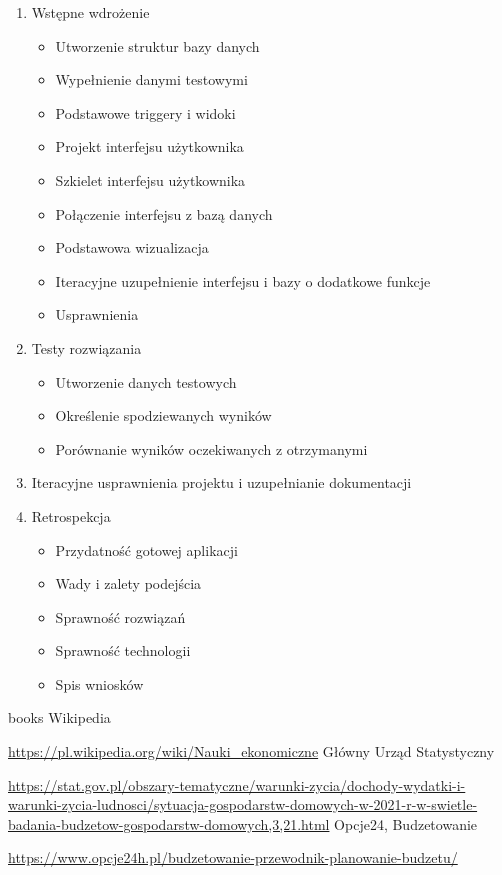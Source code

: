 \documentclass[a4paper,12pt]{report}
\begin{document}
{\begin{enumerate}
\begin{itemize}
    \end{itemize}
    \item Wstępne wdrożenie
    \begin{itemize}
        \item Utworzenie struktur bazy danych
        \item Wypełnienie danymi testowymi
        \item Podstawowe triggery i widoki
        \item Projekt interfejsu użytkownika
        \item Szkielet interfejsu użytkownika
        \item Połączenie interfejsu z bazą danych
        \item Podstawowa wizualizacja
        \item Iteracyjne uzupełnienie interfejsu i bazy o dodatkowe funkcje
        \item Usprawnienia
    \end{itemize}
    \item Testy rozwiązania
    \begin{itemize}
        \item Utworzenie danych testowych
        \item Określenie spodziewanych wyników
        \item Porównanie wyników oczekiwanych z otrzymanymi 
    \end{itemize}
    \item Iteracyjne usprawnienia projektu i uzupełnianie dokumentacji
    \item Retrospekcja
    \begin{itemize}
        \item Przydatność gotowej aplikacji
        \item Wady i zalety podejścia
        \item Sprawność rozwiązań
        \item Sprawność technologii
        \item Spis wniosków
    \end{itemize}
\end{enumerate}
}
\begin{thebibliography} {books}
 Wikipedia \raggedright\url{https://pl.wikipedia.org/wiki/Nauki_ekonomiczne}
 Główny Urząd Statystyczny \raggedright\url{https://stat.gov.pl/obszary-tematyczne/warunki-zycia/dochody-wydatki-i-warunki-zycia-ludnosci/sytuacja-gospodarstw-domowych-w-2021-r-w-swietle-badania-budzetow-gospodarstw-domowych,3,21.html}
 Opcje24, Budzetowanie \raggedright\url{https://www.opcje24h.pl/budzetowanie-przewodnik-planowanie-budzetu/}
\end{thebibliography}
\end{document}
